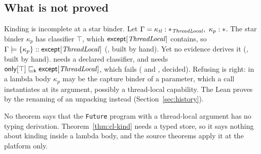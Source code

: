 \subsection{What is not proved}\label{sec:cl-open}

\begin{example}[An incompleteness]\label{ex:cl-k6}
Kinding is incomplete at a star binder. Let $\Gamma = \kappa_{\mathit{tl}} : \ast_{\mathit{ThreadLocal}},\ \kappa_p : \ast$. The star binder $\kappa_p$ has classifier $\top$, which $\mathsf{except}[\mathit{ThreadLocal}]$ contains, so $\Gamma \models \{\kappa_p\} :: \mathsf{except}[\mathit{ThreadLocal}]$ (, built by hand). Yet no evidence derives it (, built by hand).  needs a declared classifier, and  needs $\mathsf{only}[\top] \sqsubseteq_{\mathsf{k}} \mathsf{except}[\mathit{ThreadLocal}]$, which fails ( and , decided). Refusing is right: in a lambda body $\kappa_p$ may be the capture binder of a parameter, which a call instantiates at its argument, possibly a thread-local capability. The Lean proves  by the renaming of an unpacking instead (Section~\ref{sec:history}).
\end{example}

No theorem says that the \lstinline{Future} program with a thread-local argument has no typing derivation. Theorem~\ref{thm:cl-kind} needs a typed store, so it says nothing about kinding inside a lambda body, and the source theorems apply it at the platform only.
